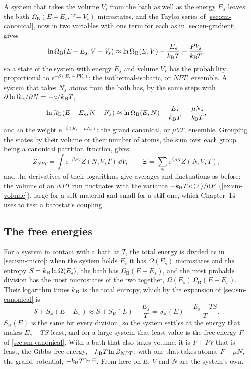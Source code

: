 A system that takes the volume $V_s$ from the bath as well as the energy
$E_s$ leaves the bath $\Omega_{\mathrm B}(E - E_s, V - V_s)$ microstates,
and the Taylor series of \cref{sec:sm-canonical}, now in two variables
with one term for each as in \cref{sec:en-gradient}, gives
\begin{equation*}
   \ln\Omega_{\mathrm B}(E - E_s, V - V_s) \approx \ln\Omega_{\mathrm B}(E, V)
   - \frac{E_s}{k_{\mathrm{B}} T} - \frac{PV_s}{k_{\mathrm{B}} T} ,
\end{equation*}
so a state of the system with energy $E_s$ and volume $V_s$ has the
probability proportional to $\mathrm{e}^{-\beta(E_s + PV_s)}$: the
isothermal-isobaric, or $NPT$, ensemble. A system that takes $N_s$ atoms
from the bath has, by the same steps with $\partial\ln\Omega_{\mathrm
B}/\partial N = -\mu/k_{\mathrm{B}} T$,
\begin{equation*}
   \ln\Omega_{\mathrm B}(E - E_s, N - N_s) \approx \ln\Omega_{\mathrm B}(E, N)
   - \frac{E_s}{k_{\mathrm{B}} T} + \frac{\mu N_s}{k_{\mathrm{B}} T} ,
\end{equation*}
and so the weight $\mathrm{e}^{-\beta(E_s - \mu N_s)}$: the grand
canonical, or $\mu VT$, ensemble. Grouping the states by their volume or
their number of atoms, the sum over each group being a canonical partition
function, gives
\begin{equation*}
   Z_{NPT} = \int\mathrm{e}^{-\beta PV}Z(N, V, T)\,\dd V , \qquad
   \Xi = \sum_N\mathrm{e}^{\beta\mu N}Z(N, V, T) ,
\end{equation*}
and the derivatives of their logarithms give averages and fluctuations as
before: the volume of an $NPT$ run fluctuates with the variance $-k_{\mathrm{B}}
T\,\mathrm{d}\langle V \rangle/\mathrm{d} P$ (\cref{ex:sm-volume}), large for a soft material and
small for a stiff one, which Chapter~14 uses to test a barostat's
coupling.

\subsection*{The free energies}

For a system in contact with a bath at $T$, the total energy is divided as
in \cref{sec:sm-micro}: when the system holds $E_s$ it has $\Omega(E_s)$
microstates and the entropy $S = k_{\mathrm{B}}\ln\Omega(E_s)$, the bath has
$\Omega_{\mathrm B}(E - E_s)$, and the most probable division has the most
microstates of the two together, $\Omega(E_s)\,\Omega_{\mathrm B}(E -
E_s)$. Their logarithm times $k_{\mathrm{B}}$ is the total entropy, which by the
expansion of \cref{sec:sm-canonical} is
\begin{equation*}
   S + S_{\mathrm B}(E - E_s) \approx S + S_{\mathrm B}(E)
   - \frac{E_s}{T} = S_{\mathrm B}(E) - \frac{E_s - TS}{T} .
\end{equation*}
$S_{\mathrm B}(E)$ is the same for every division, so the system settles
at the energy that makes $E_s - TS$ least, and for a large system that
least value is the free energy $F$ of \cref{sec:sm-canonical}. With a bath
that also takes volume, it is $F + PV$ that is least, the Gibbs free
energy, $-k_{\mathrm{B}} T\ln Z_{NPT}$; with one that takes atoms, $F - \mu N$, the
grand potential, $-k_{\mathrm{B}} T\ln\Xi$. From here on $E$, $V$ and $N$ are the
system's own.

